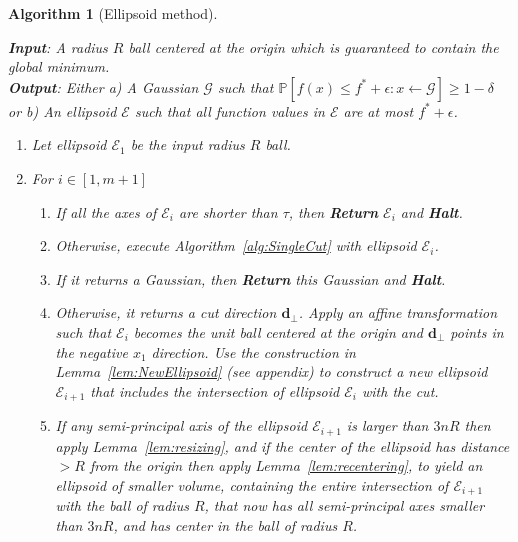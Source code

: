 \documentclass[11pt,letter]{article}
\renewcommand{\Pr}{\mathbb{P}}
\newcommand{\from}{\leftarrow}
\renewcommand{\vec}[1]{\mathbf{#1}}
\newcommand{\ferr}{\epsilon}
\newcommand{\perr}{\delta}
\numberwithin{nTheorems}{section}
\newtheorem{myalgorithm}{Algorithm}
\begin{document}
\vspace{3mm}
\hspace*{-\parindent}\begin{minipage}{\linewidth}
\begin{framed}
\begin{myalgorithm}[Ellipsoid method]
\label{alg:Ellipsoid}

\noindent\textbf{Input}: A radius $R$ ball centered at the origin which is guaranteed to contain the global minimum.\\
\textbf{Output}: \emph{Either} a) A Gaussian $\mathcal{G}$ such that $\Pr[f(x) \le f^\ast + \ferr: x \from \mathcal{G}] \ge 1 - \perr$ \emph{or} b) An ellipsoid $\mathcal{E}$ such that all function values in $\mathcal{E}$ are at most $f^\ast + \ferr$.
\begin{enumerate}
   \item Let ellipsoid $\mathcal{E}_1$ be the input radius $R$ ball.
   \item For $i \in [1, m+1]$
         \begin{enumerate}
            \renewcommand{\labelenumii}{\arabic{enumi}\alph{enumii}.}
            \item If all the axes of $\mathcal{E}_i$ are shorter than $\tau$, then \textbf{Return} $\mathcal{E}_i$ and \textbf{Halt}.
            \item Otherwise, execute Algorithm~\ref{alg:SingleCut} with ellipsoid $\mathcal{E}_i$.
            \item If it returns a Gaussian, then \textbf{Return} this Gaussian and \textbf{Halt}.
            \item Otherwise, it returns a cut direction $\vec{d}_\bot$.
            Apply an affine transformation such that $\mathcal{E}_i$ becomes the unit ball centered at the origin and $\vec{d}_\bot$ points in the negative $x_1$ direction.
            Use the construction in Lemma~\ref{lem:NewEllipsoid} (see appendix) to construct a new ellipsoid $\mathcal{E}_{i+1}$ that includes the intersection of ellipsoid $\mathcal{E}_i$ with the cut.
            \item If any semi-principal axis of the ellipsoid $\mathcal{E}_{i+1}$ is larger than $3nR$ then apply Lemma~\ref{lem:resizing}, and if the center of the ellipsoid has distance $>R$ from the origin then apply Lemma~\ref{lem:recentering}, to yield an ellipsoid of smaller volume, containing the entire intersection of $\mathcal{E}_{i+1}$ with the ball of radius $R$, that now has all semi-principal axes smaller than $3nR$, and has center in the ball of radius $R$.
          \end{enumerate}
\end{enumerate}
\end{myalgorithm}
\end{framed}
\end{minipage}
\vspace{3mm}
\end{document}
